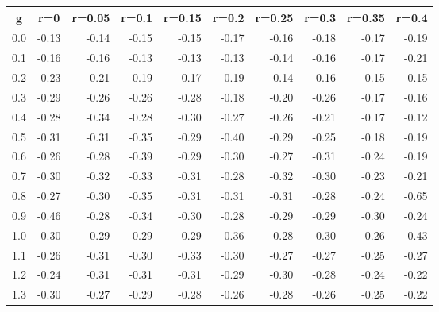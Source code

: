 %
\begin{table}[!tbp]
 \begin{center}
 \begin{tabular}{rrrrrrrrrr}\hline\hline
\multicolumn{1}{c}{g}&\multicolumn{1}{c}{r=0}&\multicolumn{1}{c}{r=0.05}&\multicolumn{1}{c}{r=0.1}&\multicolumn{1}{c}{r=0.15}&\multicolumn{1}{c}{r=0.2}&\multicolumn{1}{c}{r=0.25}&\multicolumn{1}{c}{r=0.3}&\multicolumn{1}{c}{r=0.35}&\multicolumn{1}{c}{r=0.4}\tabularnewline
\hline
0.0&-0.13&-0.14&-0.15&-0.15&-0.17&-0.16&-0.18&-0.17&-0.19\tabularnewline
0.1&-0.16&-0.16&-0.13&-0.13&-0.13&-0.14&-0.16&-0.17&-0.21\tabularnewline
0.2&-0.23&-0.21&-0.19&-0.17&-0.19&-0.14&-0.16&-0.15&-0.15\tabularnewline
0.3&-0.29&-0.26&-0.26&-0.28&-0.18&-0.20&-0.26&-0.17&-0.16\tabularnewline
0.4&-0.28&-0.34&-0.28&-0.30&-0.27&-0.26&-0.21&-0.17&-0.12\tabularnewline
0.5&-0.31&-0.31&-0.35&-0.29&-0.40&-0.29&-0.25&-0.18&-0.19\tabularnewline
0.6&-0.26&-0.28&-0.39&-0.29&-0.30&-0.27&-0.31&-0.24&-0.19\tabularnewline
0.7&-0.30&-0.32&-0.33&-0.31&-0.28&-0.32&-0.30&-0.23&-0.21\tabularnewline
0.8&-0.27&-0.30&-0.35&-0.31&-0.31&-0.31&-0.28&-0.24&-0.65\tabularnewline
0.9&-0.46&-0.28&-0.34&-0.30&-0.28&-0.29&-0.29&-0.30&-0.24\tabularnewline
1.0&-0.30&-0.29&-0.29&-0.29&-0.36&-0.28&-0.30&-0.26&-0.43\tabularnewline
1.1&-0.26&-0.31&-0.30&-0.33&-0.30&-0.27&-0.27&-0.25&-0.27\tabularnewline
1.2&-0.24&-0.31&-0.31&-0.31&-0.29&-0.30&-0.28&-0.24&-0.22\tabularnewline
1.3&-0.30&-0.27&-0.29&-0.28&-0.26&-0.28&-0.26&-0.25&-0.22\tabularnewline
\hline
\end{tabular}

\end{center}

\end{table}

